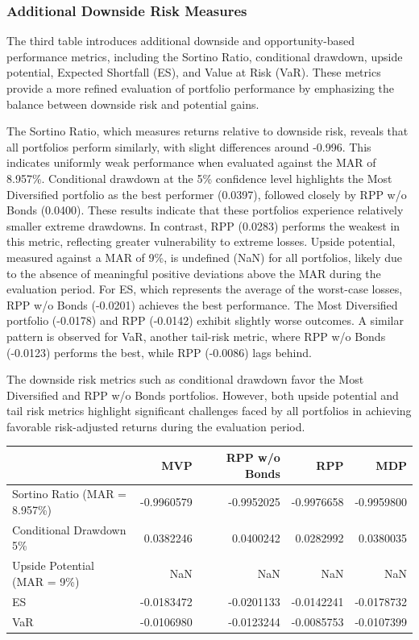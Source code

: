 \documentclass[11pt,preprint]{elsarticle}
\let\origtable\table
\let\endorigtable\endtable
\renewenvironment{table}[1][2] {
    \expandafter\origtable\expandafter[H]
} {
    \endorigtable
}
\numberwithin{equation}{section}
\numberwithin{figure}{section}
\numberwithin{table}{section}
\begin{document}
\subsubsection{Additional Downside Risk
Measures}\label{additional-downside-risk-measures}

The third table introduces additional downside and opportunity-based
performance metrics, including the Sortino Ratio, conditional drawdown,
upside potential, Expected Shortfall (ES), and Value at Risk (VaR).
These metrics provide a more refined evaluation of portfolio performance
by emphasizing the balance between downside risk and potential gains.

The Sortino Ratio, which measures returns relative to downside risk,
reveals that all portfolios perform similarly, with slight differences
around -0.996. This indicates uniformly weak performance when evaluated
against the MAR of 8.957\%. Conditional drawdown at the 5\% confidence
level highlights the Most Diversified portfolio as the best performer
(0.0397), followed closely by RPP w/o Bonds (0.0400). These results
indicate that these portfolios experience relatively smaller extreme
drawdowns. In contrast, RPP (0.0283) performs the weakest in this
metric, reflecting greater vulnerability to extreme losses. Upside
potential, measured against a MAR of 9\%, is undefined (NaN) for all
portfolios, likely due to the absence of meaningful positive deviations
above the MAR during the evaluation period. For ES, which represents the
average of the worst-case losses, RPP w/o Bonds (-0.0201) achieves the
best performance. The Most Diversified portfolio (-0.0178) and RPP
(-0.0142) exhibit slightly worse outcomes. A similar pattern is observed
for VaR, another tail-risk metric, where RPP w/o Bonds (-0.0123)
performs the best, while RPP (-0.0086) lags behind.

The downside risk metrics such as conditional drawdown favor the Most
Diversified and RPP w/o Bonds portfolios. However, both upside potential
and tail risk metrics highlight significant challenges faced by all
portfolios in achieving favorable risk-adjusted returns during the
evaluation period.

\begin{table}
\centering
\caption{\label{tab:downside-metrics}Downside and Opportunity-based Performance Metrics}
\centering
\begin{tabular}[t]{l|r|r|r|r}
\hline
  & MVP & RPP w/o Bonds & RPP & MDP\\
\hline
Sortino Ratio (MAR = 8.957\%) & -0.9960579 & -0.9952025 & -0.9976658 & -0.9959800\\
\hline
Conditional Drawdown 5\% & 0.0382246 & 0.0400242 & 0.0282992 & 0.0380035\\
\hline
Upside Potential (MAR = 9\%) & NaN & NaN & NaN & NaN\\
\hline
ES & -0.0183472 & -0.0201133 & -0.0142241 & -0.0178732\\
\hline
VaR & -0.0106980 & -0.0123244 & -0.0085753 & -0.0107399\\
\hline
\end{tabular}
\end{table}
\end{document}
